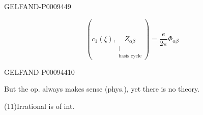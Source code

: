 \begin{GelfandAdjacentEvidence}{GELFAND-P000944}{9}


\begin{equation*}
 \left(c_1(\xi),\underset{\substack{\vert\\\text{basis cycle}}}{Z_{\alpha\beta}}\right)
 =\frac e{2\pi}\Phi_{\alpha\beta}
 \tag{10}
\end{equation*}
\end{GelfandAdjacentEvidence}
\begin{GelfandAdjacentEvidence}{GELFAND-P000944}{10}


But the op. always makes sense (phys.), yet there is no theory.

(11)\quad Irrational is of int. 
\end{GelfandAdjacentEvidence}


